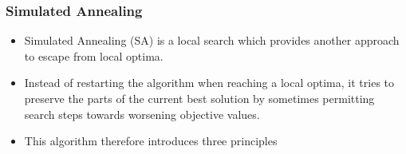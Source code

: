 \documentclass[mathserif]{beamer}%
\begin{document}
%
\begin{frame}%
\frametitle{Simulated Annealing}%
\begin{itemize}%
\item Simulated Annealing (SA)\cite{KGV1983OBSA,C1985TATTTSPAESA,DPSW1982MCTICO,P1970AMCMFTASOCTOCOP} is a local search which provides another approach to escape from local optima\cite{WGOEB,S2003ITSSAO}.%
\item<2-> Instead of restarting the algorithm when reaching a local optima, it tries to preserve the parts of the current best solution by sometimes permitting search steps towards worsening objective values.%
\item<3-> This algorithm therefore introduces three principles%
\end{itemize}%
\end{frame}%
%
\endPresentation%
\end{document}
